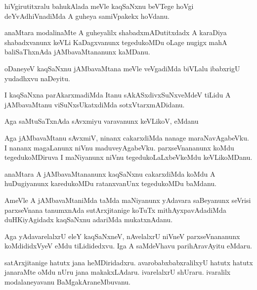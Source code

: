 \documentclass{article}
\begin{document}
\begin{mn}
hiVgirutitxralu bahukAlada meVle kaqSaNxnu beVTege hoVgi
deYvAdhiVnadiMda A guheya samiVpakekx hoVdanu.
\end{mn}

\begin{mn}
anaMtara modalinaMte A guheyalilx shabadxmADutitxdadx A karaDiya
shabadxvanunx keVLi KaDagxvanunx tegedukoMDu oLage nugigx mahA
baliSaThxnAda jAMbavaMtananunx kaMDanu.
\end{mn}

\begin{mn}
oDaneyeV kaqSaNxnu jAMbavaMtana meVle veVgadiMda biVLalu ibabxrigU
yudadhxvu naDeyitu.
\end{mn}

\begin{mn}
I kaqSaNxna parAkarxmadiMda Itanu sAkASxdivxSuNxveMdeV tiLidu A
jAMbavaMtanu viSuNxsUkatxdiMda sotxVtarxmADidanu.
\end{mn}

\begin{mn}
Aga saMtuSaTxnAda sAvxmiyu varavanunx keVLikoV, eMdanu 
\end{mn}

\begin{mn}%
Aga jAMbavaMtanu sAvxmiV, ninanx cakarxdiMda nanage maraNavAgabeVku. I
nananx magaLanunx niVnu maduveyAgabeVku. parxseVnananunx koMdu
tegedukoMDiruva I maNiyanunx niVnu tegedukoLaLxbeVkeMdu keVLikoMDanu.
\end{mn}

\begin{mn}%
anaMtara A jAMbavaMtananunx kaqSaNxnu cakarxdiMda koMdu A huDugiyanunx
karedukoMDu ratanxvanUnx tegedukoMDu baMdanu.
\end{mn}

\begin{mn}%
AmeVle A jAMbavaMtaniMda taMda maNiyanunx yAdavara saBeyanunx seVrisi
parxseVnana tanumxnAda sutArxjitanige koTuTx mithAyxpavAdadiMda
duHKiyAgidadx kaqSaNxnu adariMda mukatxnAdanu.
\end{mn}

\begin{mn}
Aga yAdavarelalxrU eleY kaqSaNxneV, nAvelalxrU niVneV parxseVnananunx
koMdididxVyeV eMdu tiLididedxvu. Iga A saMdeVhavu parihAravAyitu eMdaru.
\end{mn}

\begin{mn}%
satArxjitanige hatutx jana heMDiridadxru. avarobabxbabxralilxyU hatutx
hatutx janaraMte oMdu nUru jana makakxLAdaru. ivarelalxrU
shUraru. ivaralilx modalaneyavanu BaMgakAraneMbuvanu.
\end{mn}
\end{document}
